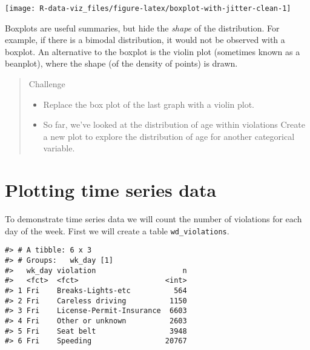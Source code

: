 \documentclass[]{book}
\newenvironment{Shaded}{\begin{snugshade}}{\end{snugshade}}
\newcommand{\CommentTok}[1]{\textcolor[rgb]{0.56,0.35,0.01}{\textit{#1}}}
\newcommand{\KeywordTok}[1]{\textcolor[rgb]{0.13,0.29,0.53}{\textbf{#1}}}
\newcommand{\NormalTok}[1]{#1}
\newcommand{\OperatorTok}[1]{\textcolor[rgb]{0.81,0.36,0.00}{\textbf{#1}}}
\newcommand{\StringTok}[1]{\textcolor[rgb]{0.31,0.60,0.02}{#1}}
\begin{document}
\texttt{[image: R-data-viz\_files/figure-latex/boxplot-with-jitter-clean-1]}

Boxplots are useful summaries, but hide the \emph{shape} of the distribution. For
example, if there is a bimodal distribution, it would not be observed with a
boxplot. An alternative to the boxplot is the violin plot (sometimes known as a
beanplot), where the shape (of the density of points) is drawn.

\begin{quote}
Challenge

\begin{itemize}
\item
  Replace the box plot of the last graph with a violin plot.
\item
  So far, we've looked at the distribution of age within violations Create a
  new plot to explore the distribution of age for another categorical variable.
\end{itemize}
\end{quote}

\hypertarget{plotting-time-series-data}{%
\section{Plotting time series data}\label{plotting-time-series-data}}

To demonstrate time series data we will count the number of violations for each day of the week. First we will create a table \texttt{wd\_violations}.

\begin{Shaded}
\end{Shaded}

\begin{verbatim}
#> # A tibble: 6 x 3
#> # Groups:   wk_day [1]
#>   wk_day violation                    n
#>   <fct>  <fct>                    <int>
#> 1 Fri    Breaks-Lights-etc          564
#> 2 Fri    Careless driving          1150
#> 3 Fri    License-Permit-Insurance  6603
#> 4 Fri    Other or unknown          2603
#> 5 Fri    Seat belt                 3948
#> 6 Fri    Speeding                 20767
\end{verbatim}
\end{document}
